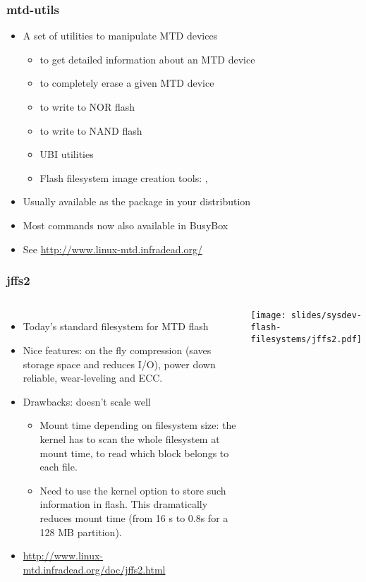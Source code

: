 \begin{frame}
  \frametitle{mtd-utils}
  \begin{itemize}
  \item A set of utilities to manipulate MTD devices
    \begin{itemize}
    \item {} to get detailed information about an MTD device
    \item {} to completely erase a given MTD device
    \item {} to write to NOR flash
    \item {} to write to NAND flash
    \item UBI utilities
    \item Flash filesystem image creation tools: ,
    \end{itemize}
  \item Usually available as the  package in your distribution
  \item Most commands now also available in BusyBox
  \item See \url{http://www.linux-mtd.infradead.org/}
  \end{itemize}
\end{frame}

\begin{frame}
  \frametitle{jffs2}
  \begin{columns}
    \begin{itemize}
    \item Today's standard filesystem for MTD flash
    \item Nice features: on the fly compression (saves storage space
      and reduces I/O), power down reliable, wear-leveling and ECC.
    \item Drawbacks: doesn't scale well
      \begin{itemize}
      \item Mount time depending on filesystem size: the kernel has to
        scan the whole filesystem at mount time, to read which block
        belongs to each file.
      \item Need to use the  kernel option
        to store such information in flash. This dramatically reduces
        mount time (from 16 s to 0.8s for a 128 MB partition).
      \end{itemize}
    \item \url{http://www.linux-mtd.infradead.org/doc/jffs2.html}
    \end{itemize}
    \texttt{[image: slides/sysdev-flash-filesystems/jffs2.pdf]}
  \end{columns}
\end{frame}

